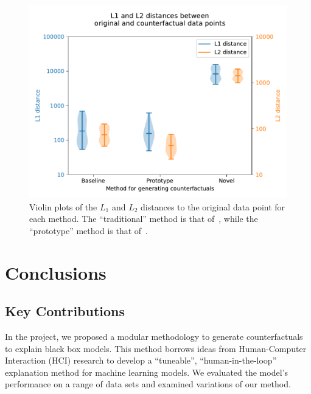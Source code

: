 \documentclass{article}
\begin{document}
\begin{figure}
    \centering
    \includegraphics[width=\linewidth]{figures/counterfactual_distances.pdf}
    \caption{Violin plots of the \(L_1\) and \(L_2\) distances to the original data point for each method. The ``traditional'' method is that of~\cite{wachter_counterfactual_2017}, while the ``prototype'' method is that of~\cite{van_looveren_conditional_2021}.\label{figure:distance}}
\end{figure}

\section{Conclusions}
\subsection{Key Contributions}
In the project, we proposed a modular methodology to generate counterfactuals to explain black box models. This method borrows ideas from Human-Computer Interaction (HCI) research to develop a ``tuneable'', ``human-in-the-loop'' explanation method for machine learning models. We evaluated the model's performance on a range of data sets and examined variations of our method.


\end{document}
